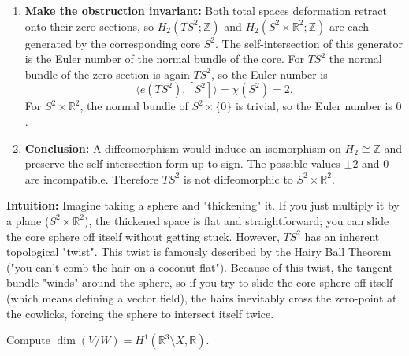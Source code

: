 \begin{solution}
\begin{enumerate}
    \item \textbf{Make the obstruction invariant:} Both total spaces deformation
    retract onto their zero sections, so $H_2(TS^2;\mathbb{Z})$ and
    $H_2(S^2\times\mathbb{R}^2;\mathbb{Z})$ are each generated by the corresponding
    core $S^2$. The self-intersection of this generator is the Euler number of the
    normal bundle of the core. For $TS^2$ the normal bundle of the zero section is
    again $TS^2$, so the Euler number is
    \[
        \langle e(TS^2),[S^2]\rangle=\chi(S^2)=2.
    \]
    For $S^2\times\mathbb{R}^2$, the normal bundle of
    $S^2\times\{0\}$ is trivial, so the Euler number is $0$.

    \item \textbf{Conclusion:} A diffeomorphism would induce an isomorphism on
    $H_2\cong\mathbb{Z}$ and preserve the self-intersection form up to sign. The
    possible values $\pm2$ and $0$ are incompatible. Therefore
    $TS^2$ is not diffeomorphic to $S^2\times\mathbb{R}^2$.
\end{enumerate}

\medskip
\textbf{Intuition:}
Imagine taking a sphere and "thickening" it. If you just multiply it by a plane ($S^2 \times \mathbb{R}^2$), the thickened space is flat and straightforward; you can slide the core sphere off itself without getting stuck. 
However, $TS^2$ has an inherent topological "twist". This twist is famously described by the Hairy Ball Theorem ("you can't comb the hair on a coconut flat"). Because of this twist, the tangent bundle "winds" around the sphere, so if you try to slide the core sphere off itself (which means defining a vector field), the hairs inevitably cross the zero-point at the cowlicks, forcing the sphere to intersect itself twice.
\end{solution}

\begin{exercise}
\label{geometry:2019:7}
Compute $\dim(V/W) = H^1(\mathbb{R}^3 \setminus X, \mathbb{R})$.
\end{exercise}

